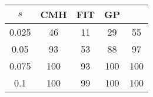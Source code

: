 \centering \begin{tabular}{c|c|c|c|c}
$s$	&CMH	&FIT	&GP	&\sc{Clear}\\\hline
0.025	&46	&11	&29	&55\\
0.05	&93	&53	&88	&97\\
0.075	&100	&93	&100	&100\\
0.1	&100	&99	&100	&100\\
\end{tabular}

